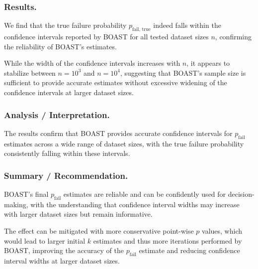     \subsubsection{Results.}

    We find that the true failure probability $p_\text{fail, true}$ indeed falls within the confidence intervals reported by BOAST for all tested dataset sizes $n$, confirming the reliability of BOAST's estimates.

    While the width of the confidence intervals increases with $n$, it appears to stabilize between $n = 10^3$ and $n = 10^4$, suggesting that BOAST's sample size is sufficient to provide accurate estimates without excessive widening of the confidence intervals at larger dataset sizes.

    \subsubsection{Analysis / Interpretation.}

    The results confirm that BOAST provides accurate confidence intervals for $p_\text{fail}$ estimates across a wide range of dataset sizes, with the true failure probability consistently falling within these intervals.

    \subsubsection{Summary / Recommendation.}

    BOAST's final $p_\text{fail}$ estimates are reliable and can be confidently used for decision-making, with the understanding that confidence interval widths may increase with larger dataset sizes but remain informative.

    The effect can be mitigated with more conservative point-wise $p$ values, which would lead to larger initial $k$ estimates and thus more iterations performed by BOAST, improving the accuracy of the $p_\text{fail}$ estimate and reducing confidence interval widths at larger dataset sizes.